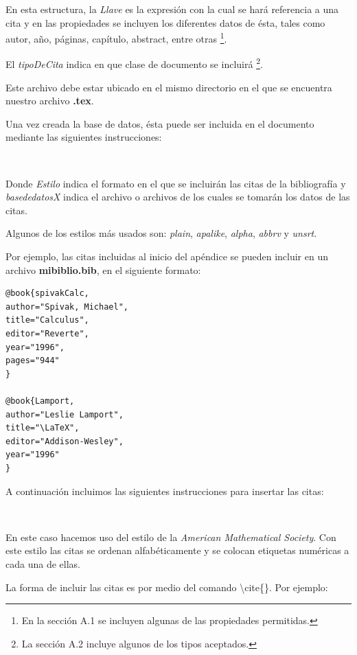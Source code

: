 \documentclass[letterpaper,12pt]{book}
\begin{document}
En esta estructura, la \emph{Llave} es la expresión con la cual 
se hará referencia a una cita y en las propiedades se incluyen
los diferentes datos de ésta, tales como autor, año, páginas,
capítulo, abstract, entre otras \footnote{En la sección A.1
se incluyen algunas de las propiedades permitidas.}.

El \emph{tipoDeCita} indica en que clase de documento se incluirá
\footnote{La sección A.2 incluye algunos de los tipos
aceptados.}.

Este archivo debe estar ubicado en el mismo directorio en el que
se encuentra nuestro archivo \textbf{.tex}.

Una vez creada la base de datos, ésta puede ser incluida en el
documento mediante las siguientes instrucciones:

\begin{verbatim}


\end{verbatim}

Donde \emph{Estilo} indica el formato en el que se incluirán las
citas de la bibliografía y \emph{basededatosX} indica el archivo
o archivos de los cuales se tomarán los datos de las citas.

Algunos de los estilos más usados son: \emph{plain},
\emph{apalike}, \emph{alpha}, \emph{abbrv} y \emph{unsrt}.

Por ejemplo, las citas incluidas al inicio del apéndice se 
pueden incluir en un archivo \textbf{mibiblio.bib}, en el
siguiente formato:

\begin{verbatim}
@book{spivakCalc,
author="Spivak, Michael",
title="Calculus",
editor="Reverte",
year="1996",
pages="944"
}

@book{Lamport,
author="Leslie Lamport",
title="\LaTeX",
editor="Addison-Wesley",
year="1996"
}
\end{verbatim}

A continuación incluimos las siguientes instrucciones para 
insertar las citas:

\begin{verbatim}


\end{verbatim}

En este caso hacemos uso del estilo de la \emph{American 
Mathematical Society}. Con este estilo las citas se ordenan
alfabéticamente y se colocan etiquetas numéricas a cada una
de ellas.

La forma de incluir las citas es por medio del comando \textbackslash cite\{\}.
Por ejemplo:
\end{document}
